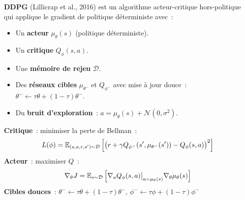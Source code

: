 \begin{definition}[DDPG]
\textbf{DDPG} (Lillicrap et al., 2016) est un algorithme acteur-critique
hors-politique qui applique le gradient de politique d\'eterministe avec~:
\begin{itemize}
    \item Un \textbf{acteur} $\mu_\theta(s)$ (politique d\'eterministe).
    \item Un \textbf{critique} $Q_\phi(s, a)$.
    \item Une \textbf{m\'emoire de rejeu} $\mathcal{D}$.
    \item Des \textbf{r\'eseaux cibles} $\mu_{\theta^-}$ et $Q_{\phi^-}$ avec
    mise \`a jour douce~: $\theta^- \leftarrow \tau \theta + (1-\tau)\theta^-$.
    \item Du \textbf{bruit d'exploration}~: $a = \mu_\theta(s) + \mathcal{N}(0, \sigma^2)$.
\end{itemize}
\end{definition}

\begin{formules}[title=\textbf{Mises \`a jour DDPG}]
\textbf{Critique}~: minimiser la perte de Bellman~:
\[
    L(\phi) = \mathbb{E}_{(s,a,r,s') \sim \mathcal{D}}\left[
    \left(r + \gamma Q_{\phi^-}(s', \mu_{\theta^-}(s')) - Q_\phi(s, a)\right)^2
    \right]
\]
\textbf{Acteur}~: maximiser $Q$~:
\[
    \nabla_\theta J = \mathbb{E}_{s \sim \mathcal{D}}\left[
    \nabla_a Q_\phi(s, a)\big|_{a=\mu_\theta(s)} \nabla_\theta \mu_\theta(s)
    \right]
\]
\textbf{Cibles douces}~:
$\theta^- \leftarrow \tau \theta + (1-\tau)\theta^-$, $\phi^- \leftarrow \tau \phi + (1-\tau)\phi^-$
\end{formules}


